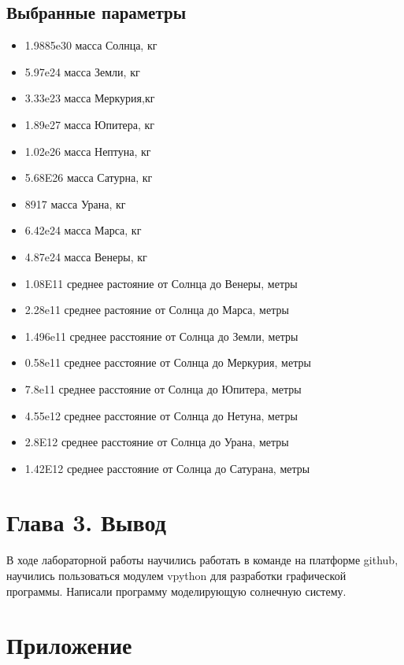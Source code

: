 \documentclass[12pt,a4paper]{extarticle}
\begin{document}
\subsection{Выбранные параметры}
\begin{itemize}
\item 1.9885e30   масса Солнца, кг
\item 5.97e24   масса Земли, кг
\item 3.33e23  масса Меркурия,кг
\item 1.89e27  масса Юпитера, кг
\item 1.02e26  масса Нептуна, кг
\item 5.68E26  масса Сатурна, кг
\item 8917  масса Урана, кг
\item 6.42e24  масса Марса, кг
\item 4.87e24  масса Венеры, кг
\item 1.08E11 среднее растояние от Солнца до Венеры, метры 
\item  2.28e11 среднее растояние от Солнца до Марса, метры 
\item  1.496e11   среднее расстояние от Солнца до Земли, метры
\item  0.58e11  среднее расстояние от Солнца до Меркурия, метры
\item  7.8e11   среднее расстояние от Солнца до Юпитера, метры
\item  4.55e12   среднее расстояние от Солнца до Нетуна, метры
\item  2.8E12  среднее расстояние от Солнца до Урана, метры
\item  1.42E12  среднее расстояние от Солнца до Сатурана, метры
\end{itemize}
\label{sec:longtermgoals}

\section{Глава 3. Вывод}
В ходе лабораторной работы научились работать в команде на платформе github, научились пользоваться модулем vpython для разработки графической программы. Написали программу моделирующую солнечную систему. 


\newpage
\section*{Приложение}
\end{document}
